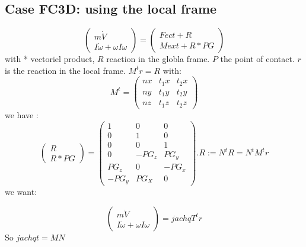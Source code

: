 \subsection{Case FC3D: using the local frame}

\[\left(\begin{array}{c}m \dot V\\I \dot \omega + \omega I \omega \end{array}\right)= \left(\begin{array}{c}Fect+R\\Mext + R*PG \end{array}\right)\]
  with * vectoriel product, $R$ reaction in the globla frame. $P$ the point of contact.
  $r$ is the reaction in the local frame.  $M^t r=R$ with:
  \[M^t=\left(\begin{array}{ccc} nx&t_1x&t_2x \\ny&t_1y&t_2y\\nz&t_1z&t_2z \end{array}\right)\]
  we have :
  \[\left(\begin{array}{c}R\\R*PG\end{array}\right)=\left(\begin{array}{ccc} 1&0&0\\0&1&0\\0&0&1\\
      0&-PG_z&PG_y\\PG_z&0&-PG_x\\-PG_y&PG_X&0\end{array}\right).R:=N^tR=N^tM^tr\]
      we want:
      
\[\left(\begin{array}{c}m \dot V\\I \dot \omega + \omega I \omega \end{array}\right)=jachqT^t r\]
So $jachqt=MN$
